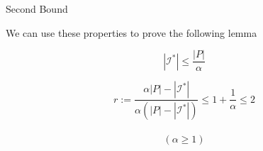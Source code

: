\begin{frame}{Second Bound}

We can use these properties to prove the following lemma 

\begin{lemma}
$$ |\mathcal{I}^*| \leq \frac{|P|}{\alpha} $$
\end{lemma}

\pause\begin{corollary}
$$
r 													:= 
\frac{\alpha |P| - |\mathcal{I}^*|}{\alpha (|P| - |\mathcal{I}^*|)} 	\leq 
1 + \frac{1}{\alpha} 								\leq 
2
$$
\\
\tiny
$$(\alpha \geq 1)$$
\end{corollary}


\end{frame}


